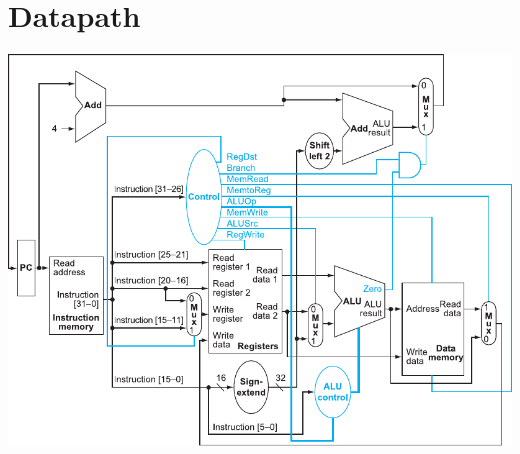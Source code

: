 \documentclass{slnotes}
\begin{document}
\onecolumn
\chapter{Datapath}
\includegraphics[width=\textwidth]{simple-mips-datapath.pdf}
\end{document}
